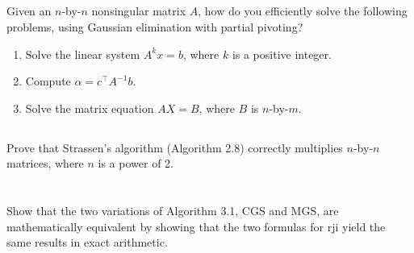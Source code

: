 \documentclass[a4paper]{ctexart}
\newcommand{\pf}{\textbf{\color{pink}{proof:}}}
\begin{document}
\pf

\subsection{}
Given an $n$-by-$n$ nonsingular matrix $A$, how do you efficiently solve the following problems, 
using Gaussian elimination with partial pivoting?
\begin{enumerate}
    \item Solve the linear system $A^k x = b$, where $k$ is a positive integer.
    \item Compute $\alpha=c^{\top} A^{-1} b$.
    \item Solve the matrix equation $AX=B$, where $B$ is $n$-by-$m$.
\end{enumerate}

\pf

\subsection{}

Prove that Strassen's algorithm (Algorithm 2.8) 
correctly multiplies $n$-by-$n$ matrices, where $n$ is a power of 2.

\pf

\section{}

\subsection{}
Show that the two variations of Algorithm 3.1, CGS
and MGS, are mathematically equivalent by showing that the two formulas for
rji yield the same results in exact arithmetic.

\pf
\end{document}
